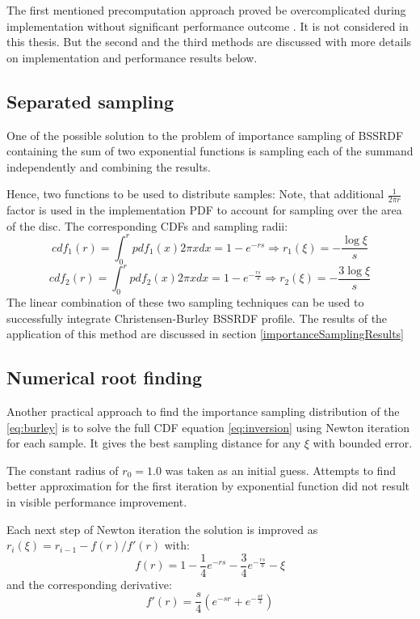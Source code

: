 The first mentioned precomputation approach proved be overcomplicated during implementation
without significant performance outcome \cite{Christensen:2015:ARP:2775280.2792555}. It is not
considered in this thesis. But the second and the third methods are discussed with more details
on implementation and performance results below.

\subsection{Separated sampling}
One of the possible solution to the problem of importance sampling of BSSRDF containing the sum of
two exponential functions is sampling each of the summand independently and combining the results.

Hence, two functions to be used to distribute samples:
\samepage{
\[
pdf_1(r)=\frac{s}{2\pi r}e^{-rs}
\]
\[
pdf_2(r)=\frac{s/3}{2\pi r}e^{\frac{-rs}{3}}
\]
}
Note, that additional $\frac{1}{2\pi r}$ factor is used in the implementation PDF to account for
sampling over the area of the disc. The corresponding \gls{CDF}s and sampling radii:
\[
cdf_1(r)=\int_{0}^{r} pdf_1(x) 2\pi xdx = 1-e^{-rs} \Rightarrow r_1(\xi)=-\frac{\log{\xi}}{s}
\]
\[
cdf_2(r)=\int_{0}^{r} pdf_2(x) 2\pi xdx = 1-e^{-\frac{rs}{3}} \Rightarrow
r_2(\xi)=-\frac{3\log{\xi}}{s}
\]
The linear combination of these two sampling techniques can be used to successfully integrate
Christensen-Burley BSSRDF profile. The results of the application of this method are discussed in
section \ref{importanceSamplingResults}

\subsection{Numerical root finding}
Another practical approach to find the importance sampling distribution of the \ref{eq:burley} is to
solve the full CDF equation \ref{eq:inversion} using Newton iteration for each sample. It gives
the best sampling distance for any $\xi$ with bounded error.

The constant radius of $r_0=1.0$ was taken as an initial guess. Attempts to find better
approximation for the first iteration by exponential function did not result in visible performance
improvement.

Each next step of Newton iteration the solution is improved as $r_i(\xi)=r_{i-1}-f(r)/f'(r)$ with:
\[
f(r) = 1 - \frac{1}{4}e^{-rs} - \frac{3}{4}e^{-\frac{rs}{3}} - \xi
\]
and the corresponding derivative:
\[
f'(r) = \frac{s}{4}(e^{-sr}+e^{-\frac{sr}{3}})
\]

